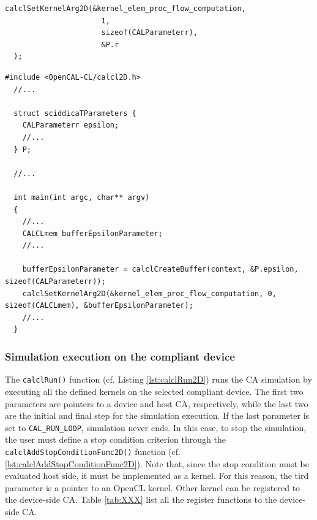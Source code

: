 
\begin{lstlisting}[float,floatplacement=H, label=lst:calclSetKernelArg2D, caption=The calclSetKernelArg2D() function., numbers=none]
  calclSetKernelArg2D(&kernel_elem_proc_flow_computation,
                      1,
                      sizeof(CALParameterr),
                      &P.r
  );
\end{lstlisting}


\begin{lstlisting}[float,floatplacement=H, label=lst:calclKernelParameters, caption=Passing parametrs to kernel.]
  #include <OpenCAL-CL/calcl2D.h>
  //...
  
  struct sciddicaTParameters {
    CALParameterr epsilon;
    //...
  } P;

  //...
  
  int main(int argc, char** argv)
  {
    //...
    CALCLmem bufferEpsilonParameter;
    //...

    bufferEpsilonParameter = calclCreateBuffer(context, &P.epsilon, sizeof(CALParameterr));
    calclSetKernelArg2D(&kernel_elem_proc_flow_computation, 0, sizeof(CALCLmem), &bufferEpsilonParameter);    
    //...
  }
\end{lstlisting}


\subsubsection{Simulation execution on the compliant device}

The \verb'calclRun()' function (cf. Listing \ref{lst:calclRun2D}) runs
the CA simulation by executing all the defined kernels on the selected
compliant device. The first two parameters are pointers to a device
and host CA, respectively, while the last two are the initial and
final step for the simulation execution. If the last parameter is set
to \verb'CAL_RUN_LOOP', simulation never ends. In this case, to stop
the simulation, the user must define a stop condition criterion
through the \verb'calclAddStopConditionFunc2D()' function
(cf. \ref{lst:calclAddStopConditionFunc2D}). Note that, since the stop
condition must be evaluated host side, it must be implemented as a
kernel. For this reason, the tird parameter is a pointer to an OpenCL
kernel. Other kernel can be registered to the device-side CA. Table
\ref{tab:XXX} list all the register functions to the device-side CA.


